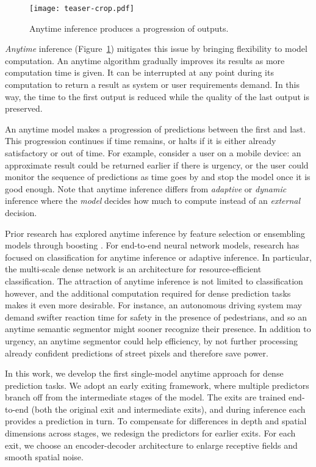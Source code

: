 \begin{figure}
   \begin{center}
    \texttt{[image: teaser-crop.pdf]}
   \end{center}
    \caption{%
    Anytime inference produces a progression of outputs.
    }
    \label{fig:teaser}
\end{figure}

\emph{Anytime} inference (Figure~\ref{fig:teaser}) mitigates this issue by bringing flexibility to model computation.
An anytime algorithm \cite{dean1988analysis} gradually improves its results as more computation time is given.
It can be interrupted at any point during its computation to return a result as system or user requirements demand.
In this way, the time to the first output is reduced while the quality of the last output is preserved.

An anytime model makes a progression of predictions between the first and last.
This progression continues if time remains, or halts if it is either already satisfactory or out of time.
For example, consider a user on a mobile device: an approximate result could be returned earlier if there is urgency, or the user could monitor the sequence of predictions as time goes by and stop the model once it is good enough.
Note that anytime inference differs from \emph{adaptive} or \emph{dynamic} inference \cite{veit2018convolutional,Wu2018BlockDropDI,wang2018skipnet} where the \emph{model} decides how much to compute instead of an \emph{external} decision. 


Prior research has explored anytime inference by feature selection \cite{karayev2014anytime} or ensembling models through boosting \cite{grubb2012speedboost}.
For end-to-end neural network models, research has focused on classification for anytime inference or adaptive inference.
In particular, the multi-scale dense network \cite{huang2017multi} is an architecture for resource-efficient classification.
The attraction of anytime inference is not limited to classification however, and the additional computation required for dense prediction tasks makes it even more desirable.
For instance, an autonomous driving system may demand swifter reaction time for safety in the presence of pedestrians, and so an anytime semantic segmentor might sooner recognize their presence.
In addition to urgency, an anytime segmentor could help efficiency, by not further processing already confident predictions of street pixels and therefore save power.

In this work, we develop the first single-model anytime approach for dense prediction tasks.
We adopt an early exiting framework, where multiple predictors branch off from the intermediate stages of the model.
The exits are trained end-to-end (both the original exit and intermediate exits), and during inference each provides a prediction in turn.
To compensate for differences in depth and spatial dimensions across stages, we redesign the predictors for earlier exits.
For each exit, we choose an encoder-decoder architecture to enlarge receptive fields and smooth spatial noise.

